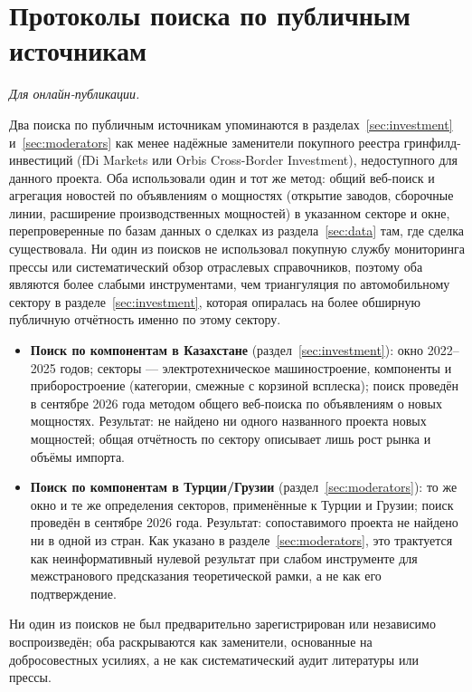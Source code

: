 \documentclass[12pt]{article}
\begin{document}
\section{Протоколы поиска по публичным источникам}\label{app:search}
\emph{Для онлайн-публикации.}

\medskip
Два поиска по публичным источникам упоминаются в разделах~\ref{sec:investment}
и~\ref{sec:moderators} как менее надёжные заменители покупного реестра
гринфилд-инвестиций (fDi Markets или Orbis Cross-Border Investment), недоступного для
данного проекта. Оба использовали один и тот же метод: общий веб-поиск и агрегация новостей
по объявлениям о мощностях (открытие заводов, сборочные линии, расширение производственных
мощностей) в указанном секторе и окне, перепроверенные по базам данных о сделках из
раздела~\ref{sec:data} там, где сделка существовала. Ни один из поисков не использовал
покупную службу мониторинга прессы или систематический обзор отраслевых справочников,
поэтому оба являются более слабыми инструментами, чем триангуляция по автомобильному
сектору в разделе~\ref{sec:investment}, которая опиралась на более обширную публичную
отчётность именно по этому сектору.

\begin{itemize}
\item \textbf{Поиск по компонентам в Казахстане} (раздел~\ref{sec:investment}): окно
2022--2025 годов; секторы — электротехническое машиностроение, компоненты и приборостроение
(категории, смежные с корзиной всплеска); поиск проведён в сентябре 2026 года методом
общего веб-поиска по объявлениям о новых мощностях. Результат: не найдено ни одного
названного проекта новых мощностей; общая отчётность по сектору описывает лишь рост рынка и
объёмы импорта.
\item \textbf{Поиск по компонентам в Турции/Грузии} (раздел~\ref{sec:moderators}): то же
окно и те же определения секторов, применённые к Турции и Грузии; поиск проведён в сентябре
2026 года. Результат: сопоставимого проекта не найдено ни в одной из стран. Как указано в
разделе~\ref{sec:moderators}, это трактуется как неинформативный нулевой результат при
слабом инструменте для межстранового предсказания теоретической рамки, а не как его
подтверждение.
\end{itemize}

Ни один из поисков не был предварительно зарегистрирован или независимо воспроизведён; оба
раскрываются как заменители, основанные на добросовестных усилиях, а не как систематический
аудит литературы или прессы.
\end{document}
